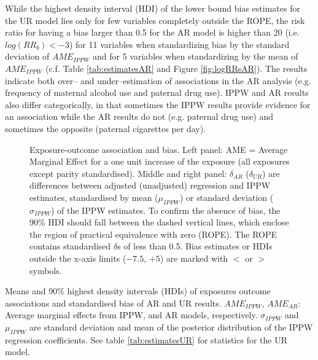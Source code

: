 \documentclass[12pt]{article}
\begin{document}
While the highest density interval (HDI) of the lower bound bias estimates for the UR model lies only for few variables completely outside the ROPE, the risk ratio for having a bias larger than 0.5 for the AR model is higher than 20 (i.e. $log(RR_b) < -3$) for 11 variables when standardizing bias by the standard deviation of $AME_{IPPW}$ and for 5 variables when standardizing by the mean of $AME_{IPPW}$ (c.f. Table  \ref{tab:estimatesAR} and Figure \ref{fig:logRRsAR}). The results indicate both over-- and under--estimation of associations in the AR analysis (e.g. frequency of maternal alcohol use and paternal drug use). IPPW and AR results also differ categorically, in that sometimes the IPPW results provide evidence for an association while the AR results do not (e.g. paternal drug use) and sometimes the opposite (paternal cigarettes per day). 

\begin{figure}
	\centering
	\caption{Exposure-outcome association and bias. Left panel: AME = Average Marginal Effect for a one unit increase of the exposure (all exposures except parity standardised). 
	Middle and right panel: $\delta_{AR}$ ($\delta_{UR}$) are differences between adjusted (unadjusted) regression and IPPW estimates, standardised by mean ($\mu_{IPPW}$) or standard deviation ($\sigma_{IPPW}$) of the IPPW estimates. To confirm the absence of bias, the 90\% HDI should fall between the dashed vertical lines, which enclose the region of practical equivalence with zero (ROPE). The ROPE contains standardised $\delta$s of less than 0.5. Bias estimates or HDIs outside the x-axis limits ($-7.5$, $+5$) are marked with $<$ or $>$  symbols.}
\label{fig:estimates}
\end{figure}

\begin{table}
	\caption{Means and 90\% highest density intervals (HDIs) of exposures outcome associations and standardised bias of AR and UR results. $AME_{IPPW}$, $AME_{AR}$: Average marginal effects from IPPW, and AR models, respectively. $\sigma_{IPPW}$ and $\mu_{IPPW}$ are standard deviation and mean of the posterior distribution of the IPPW regression coefficients. See table \ref{tab:estimatesUR} for statistics for the UR model.} 
	\label{tab:estimatesAR}
\end{table}
\end{document}
